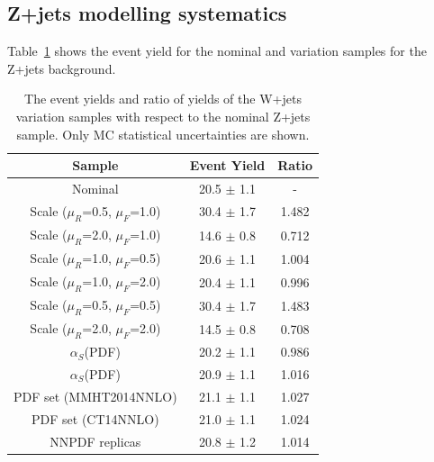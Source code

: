 \subsection{Z+jets modelling systematics}
\label{app:boosted_syst_zjets}

Table~\ref{tab:boosted_systematics_zjets_yields} shows the event yield for the nominal and variation samples 
for the Z+jets background.

\begin{table}[htbp!]
\begin{center}
\begin{tabular}{c|c|c}
Sample     & Event Yield & Ratio \\ 
\hline
Nominal                              & 20.5 $\pm$ 1.1 & -     \\
Scale ($\mu_{R}$=0.5, $\mu_{F}$=1.0) & 30.4 $\pm$ 1.7 & 1.482 \\
Scale ($\mu_{R}$=2.0, $\mu_{F}$=1.0) & 14.6 $\pm$ 0.8 & 0.712 \\
Scale ($\mu_{R}$=1.0, $\mu_{F}$=0.5) & 20.6 $\pm$ 1.1 & 1.004 \\
Scale ($\mu_{R}$=1.0, $\mu_{F}$=2.0) & 20.4 $\pm$ 1.1 & 0.996 \\
Scale ($\mu_{R}$=0.5, $\mu_{F}$=0.5) & 30.4 $\pm$ 1.7 & 1.483 \\
Scale ($\mu_{R}$=2.0, $\mu_{F}$=2.0) & 14.5 $\pm$ 0.8 & 0.708 \\
$\alpha_{S}$(PDF)                    & 20.2 $\pm$ 1.1 & 0.986 \\
$\alpha_{S}$(PDF)                    & 20.9 $\pm$ 1.1 & 1.016 \\
PDF set (MMHT2014NNLO)               & 21.1 $\pm$ 1.1 & 1.027 \\
PDF set (CT14NNLO)                   & 21.0 $\pm$ 1.1 & 1.024 \\
NNPDF replicas                       & 20.8 $\pm$ 1.2 & 1.014 \\
\end{tabular}
\end{center}
\caption{The event yields and ratio of yields of the W+jets variation samples
with respect to the nominal Z+jets sample. Only MC statistical uncertainties are shown.} 
\label{tab:boosted_systematics_zjets_yields}
\end{table}


